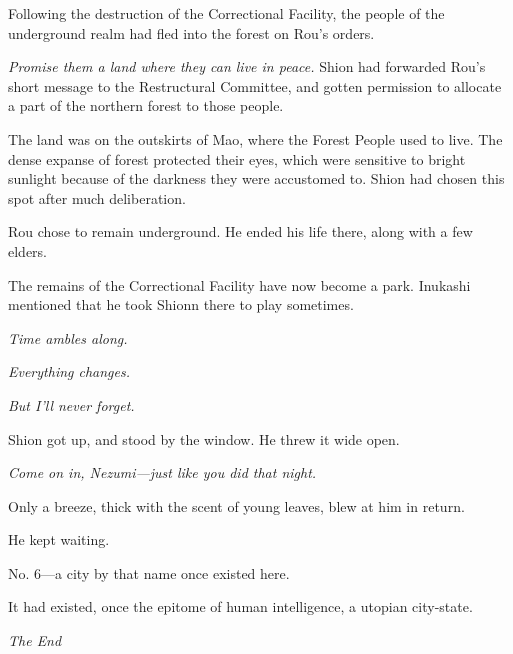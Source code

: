 
Following the destruction of the Correctional Facility, the people of
the underground realm had fled into the forest on Rou's orders.

\emph{Promise them a land where they can live in peace.} Shion had forwarded
Rou's short message to the Restructural Committee, and gotten permission
to allocate a part of the northern forest to those people.

The land was on the outskirts of Mao, where the Forest People used to
live. The dense expanse of forest protected their eyes, which were
sensitive to bright sunlight because of the darkness they were
accustomed to. Shion had chosen this spot after much deliberation.

Rou chose to remain underground. He ended his life there, along with a
few elders.

The remains of the Correctional Facility have now become a park.
Inukashi mentioned that he took Shionn there to play sometimes.

\emph{Time ambles along.}

\emph{Everything changes.}

\emph{But I'll never forget.}

Shion got up, and stood by the window. He threw it wide open.

\emph{Come on in, Nezumi---just like you did that night.}

Only a breeze, thick with the scent of young leaves, blew at him in
return.

He kept waiting.

\myspace

No. 6---a city by that name once existed here.

It had existed, once the epitome of human intelligence, a utopian
city-state.

\myspace

\begin{center}
	\sffamily
	\emph{The End}
\end{center}